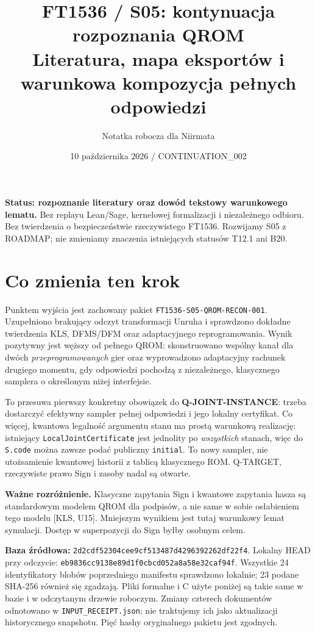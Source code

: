 \documentclass[11pt,a4paper]{article}
\title{FT1536 / S05: kontynuacja rozpoznania QROM\\
\large Literatura, mapa eksportów i warunkowa kompozycja pełnych odpowiedzi}
\author{Notatka robocza dla Niirmata}
\date{10 października 2026 / CONTINUATION\_002}
\newcommand{\code}[1]{\nolinkurl{#1}}
\begin{document}
\maketitle

\textbf{Status: rozpoznanie literatury oraz dowód tekstowy warunkowego lematu.}
Bez replayu Lean/Sage, kernelowej formalizacji i niezależnego odbioru.
Bez twierdzenia o bezpieczeństwie rzeczywistego FT1536. Rozwijamy S05 z
ROADMAP; nie zmieniamy znaczenia istniejących statusów T12.1 ani B20.

\section{Co zmienia ten krok}
Punktem wyjścia jest zachowany pakiet \code{FT1536-S05-QROM-RECON-001}.
Uzupełniono brakujący odczyt transformacji Unruha i sprawdzono dokładne
twierdzenia KLS, DFMS/DFM oraz adaptacyjnego reprogramowania.
Wynik pozytywny jest węższy od pełnego QROM: skonstruowano wspólny kanał
dla dwóch \emph{przeprogramowanych} gier oraz wyprowadzono adaptacyjny
rachunek drugiego momentu, gdy odpowiedzi pochodzą z niezależnego,
klasycznego samplera o określonym niżej interfejsie.

To przesuwa pierwszy konkretny obowiązek do \textbf{Q-JOINT-INSTANCE}:
trzeba dostarczyć efektywny sampler pełnej odpowiedzi i jego lokalny
certyfikat. Co więcej, kwantowa legalność argumentu stanu ma prostą
warunkową realizację: istniejący \code{LocalJointCertificate} jest
jednolity po \emph{wszystkich} stanach, więc do \code{S.code} można zawsze
podać publiczny \code{initial}. To nowy sampler, nie utożsamienie
kwantowej historii z tablicą klasycznego ROM.
Q-TARGET, rzeczywiste prawo Sign i zasoby nadal są otwarte.

\textbf{Ważne rozróżnienie.} Klasyczne zapytania Sign i kwantowe zapytania
hasza są standardowym modelem QROM dla podpisów, a nie same w sobie
osłabieniem tego modelu [KLS, U15]. Mniejszym wynikiem jest tutaj warunkowy
lemat symulacji. Dostęp w superpozycji do Sign byłby osobnym celem.

\textbf{Baza źródłowa:}
\code{2d2cdf52304cee9cf513487d4296392262df22f4}.
Lokalny HEAD przy odczycie:
\code{eb9836cc9138e89d1f0cbcd052a8a58e32caf94f}.
Wszystkie 24 identyfikatory blobów poprzedniego manifestu sprawdzono lokalnie;
23 podane SHA-256 również się zgadzają. Pliki formalne i C użyte poniżej
są takie same w bazie i w odczytanym drzewie roboczym. Zmiany czterech
dokumentów odnotowano w \code{INPUT_RECEIPT.json}; nie traktujemy ich jako
aktualizacji historycznego snapshotu. Pięć hashy oryginalnego pakietu jest zgodnych.
\end{document}
